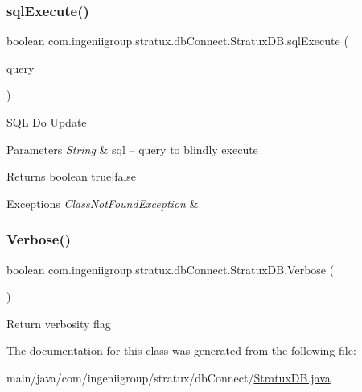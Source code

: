 \subsubsection{\texorpdfstring{sql\+Execute()}{sqlExecute()}}
{\footnotesize\ttfamily boolean com.\+ingeniigroup.\+stratux.\+db\+Connect.\+Stratux\+D\+B.\+sql\+Execute (\begin{DoxyParamCaption}\item[{String}]{query }\end{DoxyParamCaption})}

S\+QL Do Update


\begin{DoxyParams}{Parameters}
{\em String} & sql -- query to blindly execute\\
\hline
\end{DoxyParams}
\begin{DoxyReturn}{Returns}
boolean true$\vert$false 
\end{DoxyReturn}

\begin{DoxyExceptions}{Exceptions}
{\em Class\+Not\+Found\+Exception} & \\
\hline
\end{DoxyExceptions}
\mbox{\label{classcom_1_1ingeniigroup_1_1stratux_1_1db_connect_1_1_stratux_d_b_a3a3d9da8dd899bb33aa69b1edfc30971}} 
\subsubsection{\texorpdfstring{Verbose()}{Verbose()}}
{\footnotesize\ttfamily boolean com.\+ingeniigroup.\+stratux.\+db\+Connect.\+Stratux\+D\+B.\+Verbose (\begin{DoxyParamCaption}{ }\end{DoxyParamCaption})}

Return verbosity flag 

The documentation for this class was generated from the following file\+:\begin{DoxyCompactItemize}
\item 
main/java/com/ingeniigroup/stratux/db\+Connect/\hyperlink{_stratux_d_b_8java}{Stratux\+D\+B.\+java}\end{DoxyCompactItemize}
